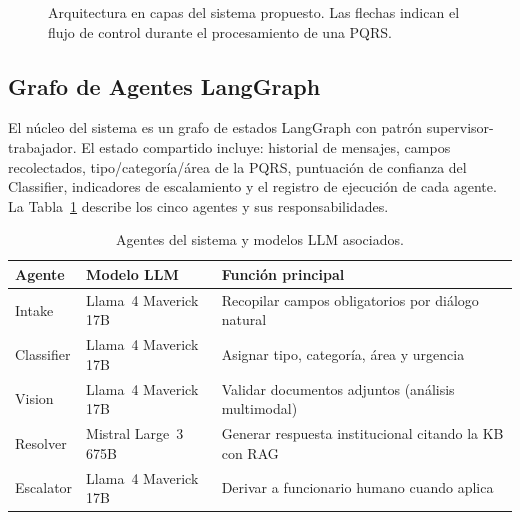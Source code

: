 \documentclass[runningheads]{llncs}
\begin{document}
\begin{figure}[h]
\centering
{}
\caption{Arquitectura en capas del sistema propuesto. Las flechas indican el flujo de control durante el procesamiento de una PQRS.}
\label{fig:arch}
\end{figure}

\subsection{Grafo de Agentes LangGraph}

El núcleo del sistema es un grafo de estados LangGraph con patrón supervisor-trabajador. El estado compartido incluye: historial de mensajes, campos recolectados, tipo/categoría/área de la PQRS, puntuación de confianza del Classifier, indicadores de escalamiento y el registro de ejecución de cada agente. La Tabla~\ref{tab:agents} describe los cinco agentes y sus responsabilidades.

\begin{table}[h]
\caption{Agentes del sistema y modelos LLM asociados.}
\label{tab:agents}
\begin{tabular}{@{}p{2.1cm}p{4.3cm}p{5.5cm}@{}}
\toprule
\textbf{Agente} & \textbf{Modelo LLM} & \textbf{Función principal} \\
\midrule
Intake     & Llama~4 Maverick 17B & Recopilar campos obligatorios por diálogo natural \\
Classifier & Llama~4 Maverick 17B & Asignar tipo, categoría, área y urgencia \\
Vision     & Llama~4 Maverick 17B & Validar documentos adjuntos (análisis multimodal) \\
Resolver   & Mistral Large~3 675B & Generar respuesta institucional citando la KB con RAG \\
Escalator  & Llama~4 Maverick 17B & Derivar a funcionario humano cuando aplica \\
\bottomrule
\end{tabular}
\end{table}
\end{document}
